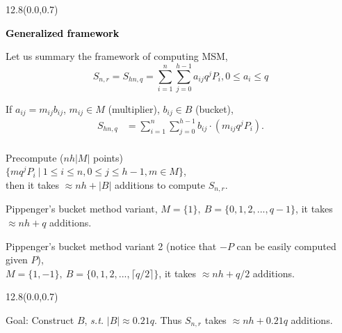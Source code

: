 \documentclass{beamer}                  %
\newcommand{\UW}[1]{\textbf{\textcolor{black}{#1}}}
\newcommand{\UWtitle}[1]{
	\begin{textblock}{12.8}(0.0,0.7)
		\begin{center} 
			\textbf{\UW{\Large{#1}}}
		\end{center}
	\end{textblock}
}
\newcommand{\fillframe}{\vspace*{10cm}}
\begin{document}
\begin{frame}
	\UWtitle{Generalized framework}
	\vspace*{1.0cm} 
	\begin{small}
			\begin{itemize}	
				\item<1-> Let us summary the framework of computing MSM,
				$$ S_{n,r} = S_{hn,q}=\sum_{i=1}^{n}\sum_{j=0}^{h-1} a_{ij}q^j P_i, 0\le a_i\le q $$
				
				\item<1-> If $a_{ij} = m_{ij}b_{ij}$, $m_{ij}\in M$ (multiplier), $b_{ij}\in B$ (bucket),
					\begin{equation*}
					\begin{aligned}
					S_{hn,q}&= \sum_{i=1}^{n}\sum_{j=0}^{h-1}b_{ij}\cdot (m_{ij}q^jP_i).\\
					\end{aligned} 
					\end{equation*}
				\item<2-> Precompute ($nh|M|$ points) \\
				$\{mq^jP_i\ |\ 1\le i\le n,0\le j\le h-1,m\in M\}$,\\
				then it takes $\approx nh +|B|$ additions to compute $S_{n,r}$.
				
				 {\item Pippenger's bucket method variant,
				$M =\{1\},\ B =\{0,1,2,...,q-1\}$, it takes $\approx nh + q$ additions.}
				\item<4-> Pippenger's bucket method variant 2 (notice that $-P$ can be easily computed given $P$),\\
				$M =\{1,-1\},\ B =\{0,1,2,...,\lceil q/2\rceil\}$, it takes $\approx nh + q/2$ additions.
			\end{itemize}
		\end{small}
	\fillframe
\end{frame}

\begin{frame}
	\UWtitle{ }
			\begin{center}	
			   \begin{block}{Goal:}
				Construct $B$, \textit{s.t.} $|B|\approx 0.21q$. Thus $S_{n,r}$ takes $\approx nh + 0.21q$ additions.
				\end{block}
			\end{center}
\end{frame}
\end{document}

